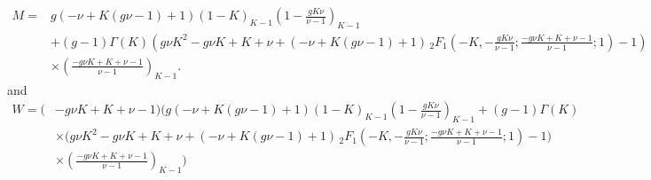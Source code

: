 \begin{align*}
M =& g (-\nu+K (g \nu-1)+1) (1-K)_{K-1} \left(1-\frac{g K \nu}{\nu-1}\right)_{K-1} \\
 &+(g-1) \Gamma (K) \left(g \nu K^2-g \nu K+K+\nu+(-\nu+K (g \nu-1)+1) \, _2F_1\left(-K,-\frac{g K \nu}{\nu-1};\frac{-g \nu K+K+\nu-1}{\nu-1};1\right)-1\right) \\
 &\times \left(\frac{-g \nu K+K+\nu-1}{\nu-1}\right)_{K-1}.
\end{align*}
and
\begin{align*}
W = (&-g \nu K+K+\nu-1) \Bigg(g (-\nu+K (g \nu-1)+1) (1-K)_{K-1} \left(1-\frac{g K \nu}{\nu-1}\right)_{K-1} +(g-1) \Gamma (K) \\
 &\times \bigg( g \nu K^2-g \nu K+K+\nu+(-\nu+K (g \nu-1)+1) \, _2F_1\left(-K,-\frac{g K \nu}{\nu-1};\frac{-g \nu K+K+\nu-1}{\nu-1};1\right)-1\bigg) \\
 &\times \left(\frac{-g \nu K+K+\nu-1}{\nu-1}\right)_{K-1}\Bigg)
\end{align*}



